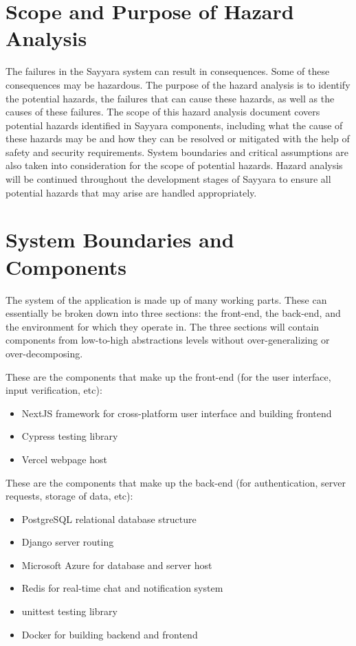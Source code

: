 \documentclass{article}
\begin{document}
\section{Scope and Purpose of Hazard Analysis}

The failures in the Sayyara system can result in consequences. Some of these consequences may be hazardous. The purpose of the hazard analysis is to identify the potential hazards, the failures that can cause these hazards, as well as the causes of these failures.
\noindent The scope of this hazard analysis document covers potential hazards identified in Sayyara components, including what the cause of these hazards may be and how they can be resolved or mitigated with the help of safety and security requirements. System boundaries and critical assumptions are also taken into consideration for the scope of potential hazards. Hazard analysis will be continued throughout the development stages of Sayyara to ensure all potential hazards that may arise are handled appropriately.

\section{System Boundaries and Components}

The system of the application is made up of many working parts. These can essentially be broken down into three sections: the front-end, the back-end, and the environment for which they operate in. The three sections will contain components from low-to-high abstractions levels without over-generalizing or over-decomposing.

These are the components that make up the front-end (for the user interface, input verification, etc):
\begin{itemize}
    \item NextJS framework for cross-platform user interface and building frontend
    \item Cypress testing library
    \item Vercel webpage host
\end{itemize}

These are the components that make up the back-end (for authentication, server requests, storage of data, etc):
\begin{itemize}
    \item PostgreSQL relational database structure 
    \item Django server routing
    \item Microsoft Azure for database and server host
    \item Redis for real-time chat and notification system
    \item unittest testing library
    \item Docker for building backend and frontend
\end{itemize}
\end{document}
